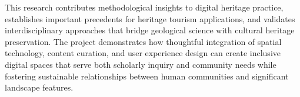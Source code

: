 \documentclass[
11pt, %
english, %
singlespacing, %
headsepline, %
]{MastersDoctoralThesis} %
\begin{document}
\begin{execSummary}
This research contributes methodological insights to digital heritage practice, establishes important precedents for heritage tourism applications, and validates interdisciplinary approaches that bridge geological science with cultural heritage preservation. The project demonstrates how thoughtful integration of spatial technology, content curation, and user experience design can create inclusive digital spaces that serve both scholarly inquiry and community needs while fostering sustainable relationships between human communities and significant landscape features.
\end{execSummary}


\tableofcontents %

\listoffigures %

\listoftables %


\mainmatter %

\pagestyle{thesis} %





 


\appendix %


%


\printbibliography[heading=bibintoc]

\end{document}
